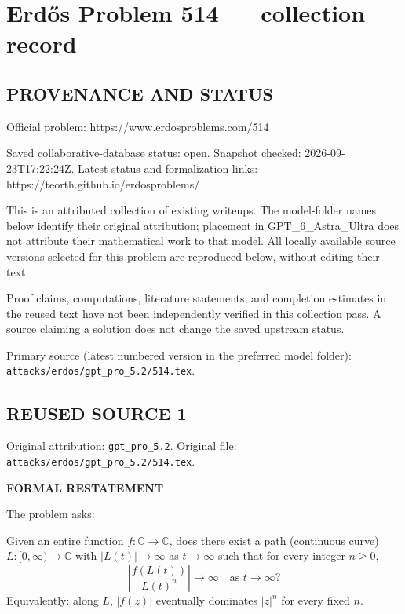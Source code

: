 \section*{Erd\H{o}s Problem 514 --- collection record}

\subsection*{PROVENANCE AND STATUS}
Official problem: https://www.erdosproblems.com/514

Saved collaborative-database status: open.
Snapshot checked: 2026-09-23T17:22:24Z.
Latest status and formalization links: https://teorth.github.io/erdosproblems/

This is an attributed collection of existing writeups. The model-folder names below identify their original attribution; placement in GPT\_6\_Astra\_Ultra does not attribute their mathematical work to that model. All locally available source versions selected for this problem are reproduced below, without editing their text.

Proof claims, computations, literature statements, and completion estimates in the reused text have not been independently verified in this collection pass. A source claiming a solution does not change the saved upstream status.

Primary source (latest numbered version in the preferred model folder): \texttt{attacks/erdos/gpt\_pro\_5.2/514.tex}.

\subsection*{REUSED SOURCE 1}
Original attribution: \texttt{gpt\_pro\_5.2}.
Original file: \texttt{attacks/erdos/gpt\_pro\_5.2/514.tex}.

\noindent\textbf{FORMAL RESTATEMENT}

The problem asks:

Given an entire function $f:\mathbb{C}\to\mathbb{C}$, does there exist a path (continuous curve) $L:[0,\infty)\to\mathbb{C}$ with $|L(t)|\to\infty$ as $t\to\infty$ such that for every integer $n\ge 0$,
\[
\left|\frac{f(L(t))}{L(t)^n}\right|\to\infty\quad\text{as }t\to\infty?
\]
Equivalently: along $L$, $|f(z)|$ eventually dominates $|z|^n$ for every fixed $n$.

